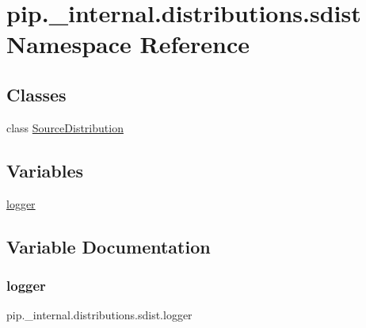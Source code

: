 \hypertarget{namespacepip_1_1__internal_1_1distributions_1_1sdist}{}\section{pip.\+\_\+internal.\+distributions.\+sdist Namespace Reference}
\label{namespacepip_1_1__internal_1_1distributions_1_1sdist}
\subsection*{Classes}
\begin{DoxyCompactItemize}
\item 
class \hyperlink{classpip_1_1__internal_1_1distributions_1_1sdist_1_1SourceDistribution}{Source\+Distribution}
\end{DoxyCompactItemize}
\subsection*{Variables}
\begin{DoxyCompactItemize}
\item 
\hyperlink{namespacepip_1_1__internal_1_1distributions_1_1sdist_ad51dceafaac1ef7940f1c08dbcd0e125}{logger}
\end{DoxyCompactItemize}


\subsection{Variable Documentation}
\mbox{\label{namespacepip_1_1__internal_1_1distributions_1_1sdist_ad51dceafaac1ef7940f1c08dbcd0e125}} 
\subsubsection{\texorpdfstring{logger}{logger}}
{\footnotesize\ttfamily pip.\+\_\+internal.\+distributions.\+sdist.\+logger}

